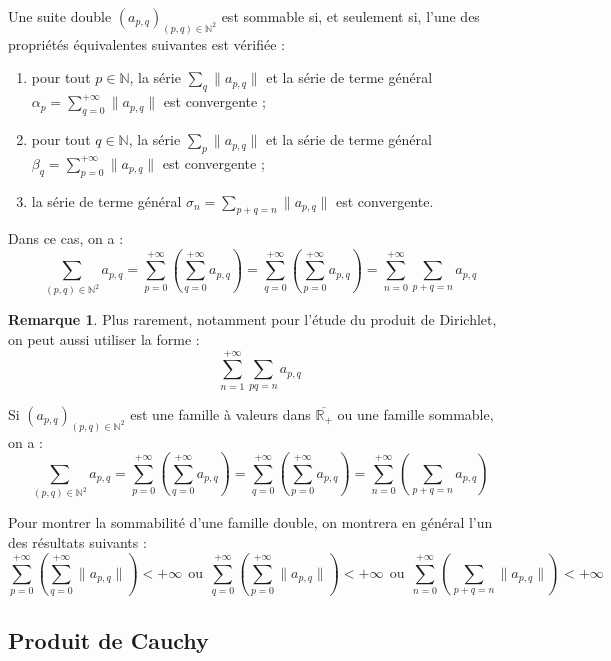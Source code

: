 \documentclass[french]{article}
\newcommand{\N}{\mathbb{N}}
\newcommand{\R}{\mathbb{R}}
\theoremstyle{plain}
\theoremstyle{definition}
\newtheorem*{rmq}{Remarque}
\theoremstyle{remark}
\begin{document}
\begin{thm}
	Une suite double $(a_{p,q})_{(p,q)\in\N^2}$ est sommable si, et seulement si, l'une des propriétés équivalentes suivantes est vérifiée :
	\begin{enumerate}[label=(\roman*)]
		\item pour tout $p\in\N$, la série $\displaystyle\sum_q\lVert a_{p,q}\rVert$ et la série de terme général $\alpha_p=\displaystyle\sum_{q=0}^{+\infty}\lVert a_{p,q}\rVert$ est convergente ;
		\item pour tout $q\in\N$, la série $\displaystyle\sum_p\lVert a_{p,q}\rVert$ et la série de terme général $\beta_q=\displaystyle\sum_{p=0}^{+\infty}\lVert a_{p,q}\rVert$ est convergente ;
		\item la série de terme général $\sigma_n=\displaystyle\sum_{p+q=n}\lVert a_{p,q}\rVert$ est convergente.
	\end{enumerate}
	Dans ce cas, on a : $$\sum_{(p,q)\in\N^2}a_{p,q}=\sum_{p=0}^{+\infty}\left(\sum_{q=0}^{+\infty}a_{p,q}\right)=\sum_{q=0}^{+\infty}\left(\sum_{p=0}^{+\infty}a_{p,q}\right)=\sum_{n=0}^{+\infty}\sum_{p+q=n}a_{p,q}$$
\end{thm}

\begin{rmq}
	Plus rarement, notamment pour l'étude du produit de Dirichlet, on peut aussi utiliser la forme : $$\sum_{n=1}^{+\infty}\sum_{pq=n}a_{p,q}$$
\end{rmq}

\begin{met}
	Si $(a_{p,q})_{(p,q)\in\N^2}$ est une famille à valeurs dans $\overline{\R_+}$ ou une famille sommable, on a : $$\sum_{(p,q)\in\N^2}a_{p,q}=\sum_{p=0}^{+\infty}\left(\sum_{q=0}^{+\infty}a_{p,q}\right)=\sum_{q=0}^{+\infty}\left(\sum_{p=0}^{+\infty}a_{p,q}\right)=\sum_{n=0}^{+\infty}\left(\sum_{p+q=n}a_{p,q}\right)$$
\end{met}

\begin{met}
	Pour montrer la sommabilité d'une famille double, on montrera en général l'un des résultats suivants : $$\sum_{p=0}^{+\infty}\left(\sum_{q=0}^{+\infty}\lVert a_{p,q}\rVert\right)<+\infty \ \ \text{ou} \ \ \sum_{q=0}^{+\infty}\left(\sum_{p=0}^{+\infty}\lVert a_{p,q}\rVert\right)<+\infty \ \ \text{ou} \ \ \sum_{n=0}^{+\infty}\left(\sum_{p+q=n}\lVert a_{p,q}\rVert\right)<+\infty$$
\end{met}

\subsection{Produit de Cauchy}
\end{document}
